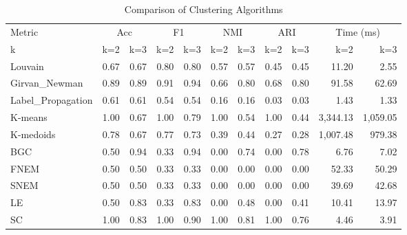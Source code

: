 \begin{table}[htbp]
\centering
\caption{Comparison of Clustering Algorithms}
\label{tab:comparison}
\small
\begin{tabular}{lrrrrrrrrrr}
\toprule
Metric & \multicolumn{2}{c}{Acc} & \multicolumn{2}{c}{F1} & \multicolumn{2}{c}{NMI} & \multicolumn{2}{c}{ARI} & \multicolumn{2}{c}{Time (ms)} \\
k & k=2 & k=3 & k=2 & k=3 & k=2 & k=3 & k=2 & k=3 & k=2 & k=3 \\
\midrule
Louvain & 0.67 & 0.67 & 0.80 & 0.80 & 0.57 & 0.57 & 0.45 & 0.45 & 11.20 & 2.55 \\
\cline{1-11}
Girvan_Newman & 0.89 & 0.89 & 0.91 & 0.94 & 0.66 & 0.80 & 0.68 & 0.80 & 91.58 & 62.69 \\
\cline{1-11}
Label_Propagation & 0.61 & 0.61 & 0.54 & 0.54 & 0.16 & 0.16 & 0.03 & 0.03 & 1.43 & 1.33 \\
\cline{1-11}
K-means & 1.00 & 0.67 & 1.00 & 0.79 & 1.00 & 0.54 & 1.00 & 0.44 & 3,344.13 & 1,059.05 \\
\cline{1-11}
K-medoids & 0.78 & 0.67 & 0.77 & 0.73 & 0.39 & 0.44 & 0.27 & 0.28 & 1,007.48 & 979.38 \\
\cline{1-11}
BGC & 0.50 & 0.94 & 0.33 & 0.94 & 0.00 & 0.74 & 0.00 & 0.78 & 6.76 & 7.02 \\
\cline{1-11}
FNEM & 0.50 & 0.50 & 0.33 & 0.33 & 0.00 & 0.00 & 0.00 & 0.00 & 52.33 & 50.29 \\
\cline{1-11}
SNEM & 0.50 & 0.50 & 0.33 & 0.33 & 0.00 & 0.00 & 0.00 & 0.00 & 39.69 & 42.68 \\
\cline{1-11}
LE & 0.50 & 0.83 & 0.33 & 0.83 & 0.00 & 0.48 & 0.00 & 0.41 & 10.41 & 13.97 \\
\cline{1-11}
SC & 1.00 & 0.83 & 1.00 & 0.90 & 1.00 & 0.81 & 1.00 & 0.76 & 4.46 & 3.91 \\
\cline{1-11}
\bottomrule
\end{tabular}
\end{table}